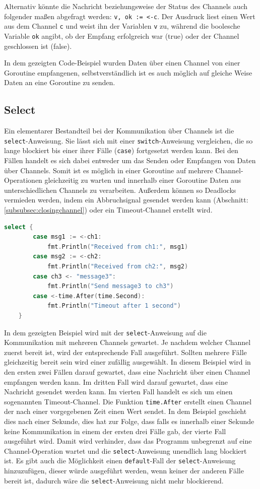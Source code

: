\documentclass[fontsize=12pt,paper=a4,twoside=semi,parskip=half-,headsepline,headinclude]{scrreprt}
\begin{document}
Alternativ könnte die Nachricht beziehungsweise der Status des Channels auch folgender maßen abgefragt werden: \texttt{v, ok := <-c}. Der Ausdruck liest einen Wert aus dem Channel \texttt{c} und weist ihn der Variablen \texttt{v} zu, während die boolesche Variable \texttt{ok} angibt, ob der Empfang erfolgreich war (true) oder der Channel geschlossen ist (false).

In dem gezeigten Code-Beispiel wurden Daten über einen Channel von einer Goroutine empfangenen, selbstverständlich ist es auch möglich auf gleiche Weise Daten an eine Goroutine zu senden.

\subsection{Select}

Ein elementarer Bestandteil bei der Kommunikation über Channels ist die \texttt{select}-Anweisung\cite{GoSpecification2024}. Sie lässt sich mit einer \texttt{switch}-Anweisung vergleichen, die so lange blockiert bis einer ihrer Fälle (\texttt{case}) fortgesetzt werden kann. Bei den Fällen handelt es sich dabei entweder um das Senden oder Empfangen von Daten über Channels. Somit ist es möglich in einer Goroutine auf mehrere Channel-Operationen gleichzeitig zu warten und innerhalb einer Goroutine Daten aus unterschiedlichen Channels zu verarbeiten. Außerdem können so Deadlocks vermieden werden, indem ein Abbruchsignal gesendet werden kann (Abschnitt: \ref{subsubsec:closingchannel}) oder ein Timeout-Channel erstellt wird.

\begin{lstlisting}[language=Go,extendedchars=true]
	select {
		case msg1 := <-ch1:
			fmt.Println("Received from ch1:", msg1)
		case msg2 := <-ch2:
			fmt.Println("Received from ch2:", msg2)
		case ch3 <- "message3":
			fmt.Println("Send message3 to ch3")
		case <-time.After(time.Second):
			fmt.Println("Timeout after 1 second")
	}
\end{lstlisting}

In dem gezeigten Beispiel wird mit der \texttt{select}-Anweisung auf die Kommunikation mit mehreren Channels gewartet. Je nachdem welcher Channel zuerst bereit ist, wird der entsprechende Fall ausgeführt. Sollten mehrere Fälle gleichzeitig bereit sein wird einer zufällig ausgewählt. In diesem Beispiel wird in den ersten zwei Fällen darauf gewartet, dass eine Nachricht über einen Channel empfangen werden kann. Im dritten Fall wird darauf gewartet, dass eine Nachricht gesendet werden kann. Im vierten Fall handelt es sich um einen sogenannten Timeout-Channel. Die Funktion \texttt{time.After} erstellt einen Channel der nach einer vorgegebenen Zeit einen Wert sendet. In dem Beispiel geschieht dies nach einer Sekunde, dies hat zur Folge, dass falls es innerhalb einer Sekunde keine Kommunikation in einem der ersten drei Fälle gab, der vierte Fall ausgeführt wird. Damit wird verhinder, dass das Programm unbegrenzt auf eine Channel-Operation wartet und die \texttt{select}-Anweisung unendlich lang blockiert ist. Es gibt auch die Möglichkeit einen \texttt{default}-Fall der \texttt{select}-Anweisung hinzuzufügen, dieser würde ausgeführt werden, wenn keiner der anderen Fälle bereit ist, dadurch wäre die \texttt{select}-Anweisung nicht mehr blockierend.
\end{document}
